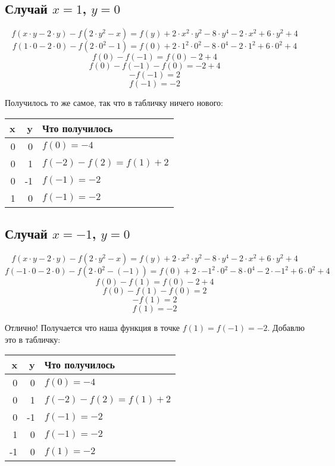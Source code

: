 \documentclass{article}
\begin{document}
\subsection{Случай $x=1$, $y=0$}
$$f(x\cdot{}y-2\cdot{}y)-f(2\cdot{}y^2-x)=f(y)+2\cdot{}x^2\cdot{}y^2-8\cdot{}y^4-2\cdot{}x^2+6\cdot{}y^2+4$$
$$f(1\cdot{}0-2\cdot{}0)-f(2\cdot{}0^2-1)=f(0)+2\cdot{}1^2\cdot{}0^2-8\cdot{}0^4-2\cdot{}1^2+6\cdot{}0^2+4$$
$$f(0)-f(-1)=f(0)-2+4$$
$$f(0)-f(-1)-f(0)=-2+4$$
$$-f(-1)=2$$
$$f(-1)=-2$$
\begin{samepage}
Получилось то же самое, так что в табличку ничего нового:
\begin{center}
 \begin{tabular}{r r l} 
 \hline
 x & y & Что получилось       \\
 \hline
 0 &  0 & $f(0)=-4$           \\
 0 &  1 & $f(-2)-f(2)=f(1)+2$ \\
 0 & -1 & $f(-1)=-2$          \\
 1 &  0 & $f(-1)=-2$ \\
 \hline
 \end{tabular}
\end{center}
\end{samepage}

\subsection{Случай $x=-1$, $y=0$}
$$f(x\cdot{}y-2\cdot{}y)-f(2\cdot{}y^2-x)=f(y)+2\cdot{}x^2\cdot{}y^2-8\cdot{}y^4-2\cdot{}x^2+6\cdot{}y^2+4$$
$$f(-1\cdot{}0-2\cdot{}0)-f(2\cdot{}0^2-(-1))=f(0)+2\cdot{}{-1}^2\cdot{}0^2-8\cdot{}{0}^4-2\cdot{}{-1}^2+6\cdot{}0^2+4$$
$$f(0)-f(1)=f(0)-2+4$$
$$f(0)-f(1)-f(0)=2$$
$$-f(1)=2$$
$$f(1)=-2$$

Отлично! Получается что наша функция в точке {\boldmath\color{red} $f(1)=f(-1)=-2$}. Добавлю это в табличку:

\begin{samepage}
\begin{center}
 \begin{tabular}{r r l} 
 \hline
 x & y & Что получилось        \\
 \hline
  0 &  0 & $f(0)=-4$           \\
  0 &  1 & $f(-2)-f(2)=f(1)+2$ \\
  0 & -1 & $f(-1)=-2$          \\
  1 &  0 & $f(-1)=-2$          \\
 -1 &  0 & $f(1)=-2$ \\
 \hline
 \end{tabular}
\end{center}
\end{samepage}
\end{document}
